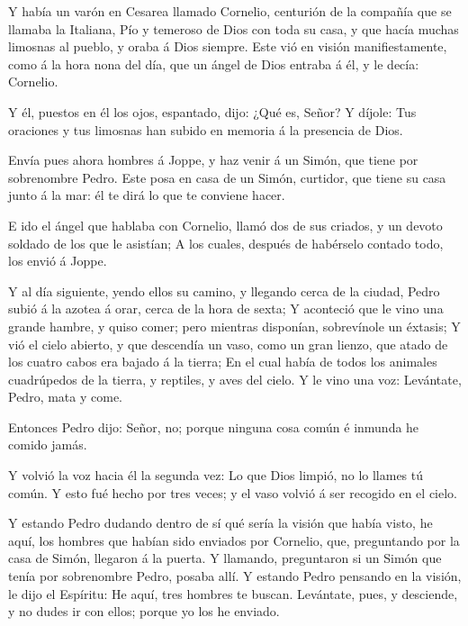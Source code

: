 Y había un varón en Cesarea llamado Cornelio, centurión de
la compañía que se llamaba la Italiana,  Pío y temeroso de
Dios con toda su casa, y que hacía muchas limosnas al pueblo, y oraba á
Dios siempre.  Este vió en visión manifiestamente, como á la
hora nona del día, que un ángel de Dios entraba á él, y le decía:
Cornelio.

 Y él, puestos en él los ojos, espantado, dijo: ¿Qué es,
Señor? Y díjole: Tus oraciones y tus limosnas han subido en memoria á la
presencia de Dios.

 Envía pues ahora hombres á Joppe, y haz venir á un Simón,
que tiene por sobrenombre Pedro.  Este posa en casa de un
Simón, curtidor, que tiene su casa junto á la mar: él te dirá lo que te
conviene hacer.

 E ido el ángel que hablaba con Cornelio, llamó dos de sus
criados, y un devoto soldado de los que le asistían;  A los
cuales, después de habérselo contado todo, los envió á Joppe.

 Y al día siguiente, yendo ellos su camino, y llegando cerca
de la ciudad, Pedro subió á la azotea á orar, cerca de la hora de sexta;
 Y aconteció que le vino una grande hambre, y quiso comer;
pero mientras disponían, sobrevínole un éxtasis;  Y vió el
cielo abierto, y que descendía un vaso, como un gran lienzo, que atado
de los cuatro cabos era bajado á la tierra;  En el cual
había de todos los animales cuadrúpedos de la tierra, y reptiles, y aves
del cielo.  Y le vino una voz: Levántate, Pedro, mata y
come.

 Entonces Pedro dijo: Señor, no; porque ninguna cosa común
é inmunda he comido jamás.

 Y volvió la voz hacia él la segunda vez: Lo que Dios
limpió, no lo llames tú común.  Y esto fué hecho por tres
veces; y el vaso volvió á ser recogido en el cielo.

 Y estando Pedro dudando dentro de sí qué sería la visión
que había visto, he aquí, los hombres que habían sido enviados por
Cornelio, que, preguntando por la casa de Simón, llegaron á la puerta.
 Y llamando, preguntaron si un Simón que tenía por
sobrenombre Pedro, posaba allí.  Y estando Pedro pensando
en la visión, le dijo el Espíritu: He aquí, tres hombres te buscan.
 Levántate, pues, y desciende, y no dudes ir con ellos;
porque yo los he enviado.

